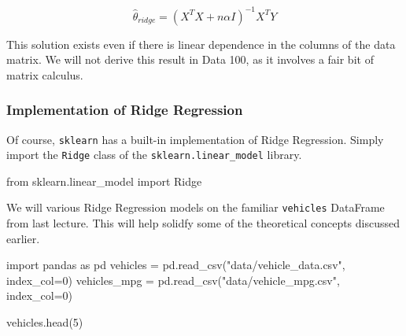 \documentclass[
  letterpaper,
  DIV=11,
  numbers=noendperiod]{scrreprt}
\newenvironment{Shaded}{\begin{snugshade}}{\end{snugshade}}
\newcommand{\DecValTok}[1]{\textcolor[rgb]{0.68,0.00,0.00}{#1}}
\newcommand{\ImportTok}[1]{\textcolor[rgb]{0.00,0.46,0.62}{#1}}
\newcommand{\NormalTok}[1]{\textcolor[rgb]{0.00,0.23,0.31}{#1}}
\newcommand{\OperatorTok}[1]{\textcolor[rgb]{0.37,0.37,0.37}{#1}}
\newcommand{\StringTok}[1]{\textcolor[rgb]{0.13,0.47,0.30}{#1}}
\begin{document}
\[\hat\theta_{ridge} = (X^TX + n\alpha I)^{-1}X^TY\]

This solution exists even if there is linear dependence in the columns
of the data matrix. We will not derive this result in Data 100, as it
involves a fair bit of matrix calculus.

\hypertarget{implementation-of-ridge-regression}{%
\subsubsection{Implementation of Ridge
Regression}\label{implementation-of-ridge-regression}}

Of course, \texttt{sklearn} has a built-in implementation of Ridge
Regression. Simply import the \texttt{Ridge} class of the
\texttt{sklearn.linear\_model} library.

\begin{Shaded}
\begin{Highlighting}[]
\ImportTok{from}\NormalTok{ sklearn.linear\_model }\ImportTok{import}\NormalTok{ Ridge}
\end{Highlighting}
\end{Shaded}

We will various Ridge Regression models on the familiar
\texttt{vehicles} DataFrame from last lecture. This will help solidfy
some of the theoretical concepts discussed earlier.

\begin{Shaded}
\begin{Highlighting}[]
\ImportTok{import}\NormalTok{ pandas }\ImportTok{as}\NormalTok{ pd}
\NormalTok{vehicles }\OperatorTok{=}\NormalTok{ pd.read\_csv(}\StringTok{"data/vehicle\_data.csv"}\NormalTok{, index\_col}\OperatorTok{=}\DecValTok{0}\NormalTok{)}
\NormalTok{vehicles\_mpg }\OperatorTok{=}\NormalTok{ pd.read\_csv(}\StringTok{"data/vehicle\_mpg.csv"}\NormalTok{, index\_col}\OperatorTok{=}\DecValTok{0}\NormalTok{)}
\end{Highlighting}
\end{Shaded}

\begin{Shaded}
\begin{Highlighting}[]
\NormalTok{vehicles.head(}\DecValTok{5}\NormalTok{)}
\end{Highlighting}
\end{Shaded}
\end{document}

